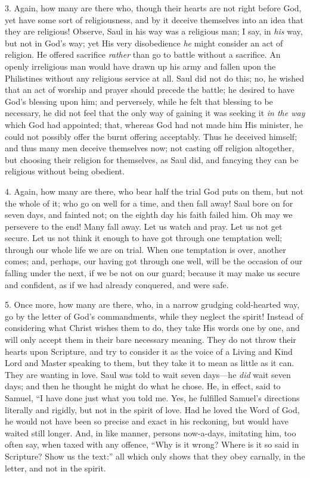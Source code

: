 3. Again, how many are there who, though their hearts are not right
before God, yet have some sort of religiousness, and by it deceive
themselves into an idea that they are religious! Observe, Saul in his
way was a religious man; I say, in \emph{his} way, but not in God's
way; yet His very disobedience \emph{he} might consider an act of
religion. He offered sacrifice \emph{rather} than go to battle without
a sacrifice. An openly irreligious man would have drawn up his army
and fallen upon the Philistines without any religious service at all.
Saul did not do this; no, he wished that an act of worship and prayer
should precede the battle; he desired to have God's blessing upon him;
and perversely, while he felt that blessing to be necessary, he did
not feel that the only way of gaining it was seeking it \emph{in the way}
which God had appointed; that, whereas God had not made him His
minister, he could not possibly offer the burnt offering acceptably.
Thus he deceived himself; and thus many men deceive themselves now;
not casting off religion altogether, but choosing their religion for
themselves, as Saul did, and fancying they can be religious without
being obedient.

4. Again, how many are there, who bear half the trial God puts on
them, but not the whole of it; who go on well for a time, and then
fall away! Saul bore on for seven days, and fainted not; on the eighth
day his faith failed him. Oh may we persevere to the end! Many fall
away. Let us watch and pray. Let us not get secure. Let us not think
it enough to have got through one temptation well; through our whole
life we are on trial. When one temptation is over, another comes; and,
perhaps, our having got through one well, will be the occasion of our
falling under the next, if we be not on our guard; because it may make
us secure and confident, as if we had already conquered, and were
safe.

5. Once more, how many are there, who, in a narrow grudging
cold-hearted way, go by the letter of God's commandments, while they
neglect the spirit! Instead of considering what Christ wishes them to
do, they take His words one by one, and will only accept them in their
bare necessary meaning. They do not throw their hearts upon Scripture,
and try to consider it as the voice of a Living and Kind Lord and
Master speaking to them, but they take it to mean as little as it can.
They are wanting in love. Saul was told to wait seven days—he \emph{did}
wait seven days; and then he thought he might do what he chose. He, in
effect, said to Samuel, ``I have done just what you told me. Yes,
he fulfilled Samuel's directions literally and rigidly, but not in the
spirit of love. Had he loved the Word of God, he would not have been
so precise and exact in his reckoning, but would have waited still
longer. And, in like manner, persons now-a-days, imitating him, too
often say, when taxed with any offence, ``Why is it wrong? Where
is it so said in Scripture? Show us the text:'' all which only
shows that they obey carnally, in the letter, and not in the spirit.

